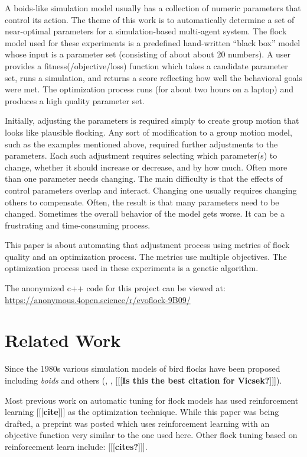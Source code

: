 \documentclass[letterpaper]{article}
\begin{document}
A boids-like simulation model usually has a collection of numeric parameters that control its action. The theme of this work is to automatically determine a set of near-optimal parameters for a simulation-based multi-agent system. The flock model used for these experiments is a predefined hand-written ``black box'' model whose input is a parameter set (consisting of about about 20 numbers). A user provides a fitness(/objective/loss) function which takes a candidate parameter set, runs a simulation, and returns a score reflecting how well the behavioral goals were met. The optimization process runs (for about two hours on a laptop) and produces a high quality parameter set.

Initially, adjusting the parameters is required simply to create group motion that looks like plausible flocking. Any sort of modification to a group motion model, such as the examples mentioned above, required further adjustments to the parameters. Each such adjustment requires selecting which parameter(s) to change, whether it should increase or decrease, and by how much. Often more than one parameter needs changing. The main difficulty is that the effects of control parameters overlap and interact. Changing one usually requires changing others to compensate. Often, the result is that many parameters need to be changed. Sometimes the overall behavior of the model gets worse. It can be a frustrating and time-consuming process.

This paper is about automating that adjustment process using metrics of flock quality and an optimization process. The metrics use multiple objectives. The optimization process used in these experiments is a genetic algorithm.

The anonymized c++ code for this project can be viewed at:
\scriptsize
\url{https://anonymous.4open.science/r/evoflock-9B09/}
\normalsize

\section{Related Work}
\label{sec:related}

Since the 1980s various simulation models of bird flocks have been proposed including \textit{boids} \citep{reynolds_flocks_1987} and others (\citet{aoki_simulation_1982}, \citet{cucker_emergent_2007}, \citet{bhattacharya_collective_2010} [[[\textbf{Is this the best citation for Vicsek?}]]]).

Most previous work on automatic tuning for flock models has used reinforcement learning [[[\textbf{cite}]]] as the optimization technique. While this paper was being drafted, a preprint was posted \citep{brambati_learning_2025} which uses reinforcement learning with an objective function very similar to the one used here. Other flock tuning based on reinforcement learn include:
[[[\textbf{cites?}]]].
\end{document}
